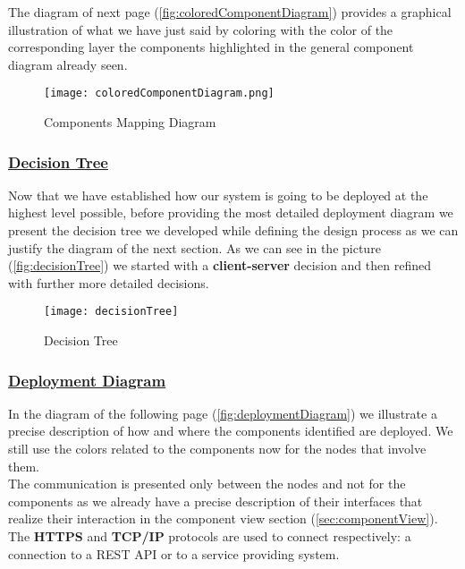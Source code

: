 		The diagram of next page (\autoref{fig:coloredComponentDiagram}) provides a graphical illustration of what we have just said by coloring with the color of the corresponding layer the components highlighted in the general component diagram already seen.
		
		\newpage
		
		\begin{figure}[htbp]
			\centering
			\texttt{[image: coloredComponentDiagram.png]}
			\caption{\label{fig:coloredComponentDiagram} Components Mapping Diagram}
		\end{figure}
	
		\FloatBarrier
	
		\subsubsection[Decision Tree]{\hyperlink{toc}{Decision Tree}}
			\label{sec:decisionTree}
			
			Now that we have established how our system is going to be deployed at the highest level possible, before providing the most detailed deployment diagram we present the decision tree we developed while defining the design process as we can justify the diagram of the next section. As we can see in the picture (\autoref{fig:decisionTree}) we started with a \textbf{client-server} decision and then refined with further more detailed decisions.
			
			\begin{figure}[h!]
				\centering
				\texttt{[image: decisionTree]}
				\caption{\label{fig:decisionTree} Decision Tree}
			\end{figure}
			
		\subsubsection[Deployment Diagram]{\hyperlink{toc}{Deployment Diagram}}
			\label{sec:deploymentDiagram}
			
			In the diagram of the following page (\autoref{fig:deploymentDiagram}) we illustrate a precise description of how and where the components identified are deployed. We still use the colors related to the components now for the nodes that involve them.\\
			
			The communication is presented only between the nodes and not for the components as we already have a precise description of their interfaces that realize their interaction in the component view section (\ref{sec:componentView}). The \textbf{HTTPS} and \textbf{TCP/IP} protocols are used to connect respectively: a connection to a REST API or to a service providing system.\\
			
